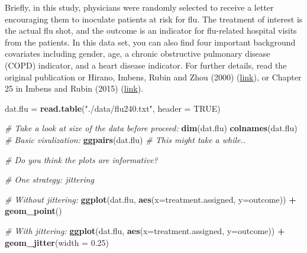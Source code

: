 \documentclass[12pt,]{book}
\newenvironment{Shaded}{\begin{snugshade}}{\end{snugshade}}
\newcommand{\KeywordTok}[1]{\textcolor[rgb]{0.13,0.29,0.53}{\textbf{#1}}}
\newcommand{\DataTypeTok}[1]{\textcolor[rgb]{0.13,0.29,0.53}{#1}}
\newcommand{\FloatTok}[1]{\textcolor[rgb]{0.00,0.00,0.81}{#1}}
\newcommand{\StringTok}[1]{\textcolor[rgb]{0.31,0.60,0.02}{#1}}
\newcommand{\CommentTok}[1]{\textcolor[rgb]{0.56,0.35,0.01}{\textit{#1}}}
\newcommand{\OtherTok}[1]{\textcolor[rgb]{0.56,0.35,0.01}{#1}}
\newcommand{\OperatorTok}[1]{\textcolor[rgb]{0.81,0.36,0.00}{\textbf{#1}}}
\newcommand{\NormalTok}[1]{#1}
\begin{document}
Briefly, in this study, physicians were randomly selected to receive a
letter encouraging them to inoculate patients at risk for flu. The
treatment of interest is the actual flu shot, and the outcome is an
indicator for flu-related hospital visits from the patients. In this
data set, you can also find four important background covariates
including gender, age, a chronic obstructive pulmonary disease (COPD)
indicator, and a heart disease indicator. For further details, read the
original publication or Hirano, Imbens, Rubin and Zhou (2000)
(\href{https://www.ncbi.nlm.nih.gov/pubmed/12933526}{link}), or Chapter
25 in Imbens and Rubin (2015)
(\href{https://www.cambridge.org/core/books/causal-inference-for-statistics-social-and-biomedical-sciences/71126BE90C58F1A431FE9B2DD07938AB}{link}).

\begin{Shaded}
\begin{Highlighting}[]
\NormalTok{dat.flu =}\StringTok{ }\KeywordTok{read.table}\NormalTok{(}\StringTok{"./data/flu240.txt"}\NormalTok{, }\DataTypeTok{header =} \OtherTok{TRUE}\NormalTok{)}

\CommentTok{# Take a look at size of the data before proceed:}
\KeywordTok{dim}\NormalTok{(dat.flu)}
\KeywordTok{colnames}\NormalTok{(dat.flu)}
\CommentTok{# Basic visulization:}
\KeywordTok{ggpairs}\NormalTok{(dat.flu) }\CommentTok{# This might take a while..}
\end{Highlighting}
\end{Shaded}

\begin{Shaded}
\begin{Highlighting}[]
\CommentTok{# Do you think the plots are informative?}

\CommentTok{# One strategy: jittering}

\CommentTok{# Without jittering:}
\KeywordTok{ggplot}\NormalTok{(dat.flu, }\KeywordTok{aes}\NormalTok{(}\DataTypeTok{x=}\NormalTok{treatment.assigned, }\DataTypeTok{y=}\NormalTok{outcome)) }\OperatorTok{+}\StringTok{ }\KeywordTok{geom_point}\NormalTok{()}
\end{Highlighting}
\end{Shaded}

\begin{Shaded}
\begin{Highlighting}[]
\CommentTok{# With jittering:}
\KeywordTok{ggplot}\NormalTok{(dat.flu, }\KeywordTok{aes}\NormalTok{(}\DataTypeTok{x=}\NormalTok{treatment.assigned, }\DataTypeTok{y=}\NormalTok{outcome)) }\OperatorTok{+}\StringTok{ }\KeywordTok{geom_jitter}\NormalTok{(}\DataTypeTok{width =} \FloatTok{0.25}\NormalTok{)}
\end{Highlighting}
\end{Shaded}
\end{document}
